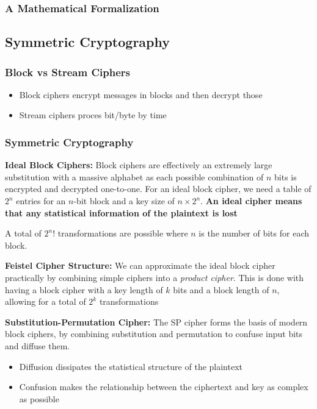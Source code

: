 \documentclass[11pt]{article}
\begin{document}
\subsubsection{A Mathematical Formalization}

\subsection{Symmetric Cryptography}
\subsubsection{Block vs Stream Ciphers}
\begin{itemize}
    \item Block ciphers encrypt messages in blocks and then decrypt those
    \item Stream ciphers proces bit/byte by time
\end{itemize}
\subsubsection{Symmetric Cryptography}
\textbf{Ideal Block Ciphers: }
Block ciphers are effectively an extremely large substitution with a massive alphabet as each possible combination of $n$ bits is encrypted and decrypted one-to-one.
For an ideal block cipher, we need a table of $2^n$ entries for an $n$-bit block and a key size of $n \times 2^n$.
\textbf{An ideal cipher means that any statistical information of the plaintext is lost}

A total of $2^n!$ transformations are possible where $n$ is the number of bits for each block.

\textbf{Feistel Cipher Structure: }
We can approximate the ideal block cipher practically by combining simple ciphers into a \textit{product cipher}.
This is done with having a block cipher with a key length of $k$ bits and a block length of $n$, allowing for a total of $2^k$ transformations

\textbf{Substitution-Permutation Cipher: }
The SP cipher forms the basis of modern block ciphers, by combining substitution and permutation to confuse input bits and diffuse them.
\begin{itemize}
    \item Diffusion dissipates the statistical structure of the plaintext
    \item Confusion makes the relationship between the ciphertext and key as complex as possible
\end{itemize}
\end{document}
